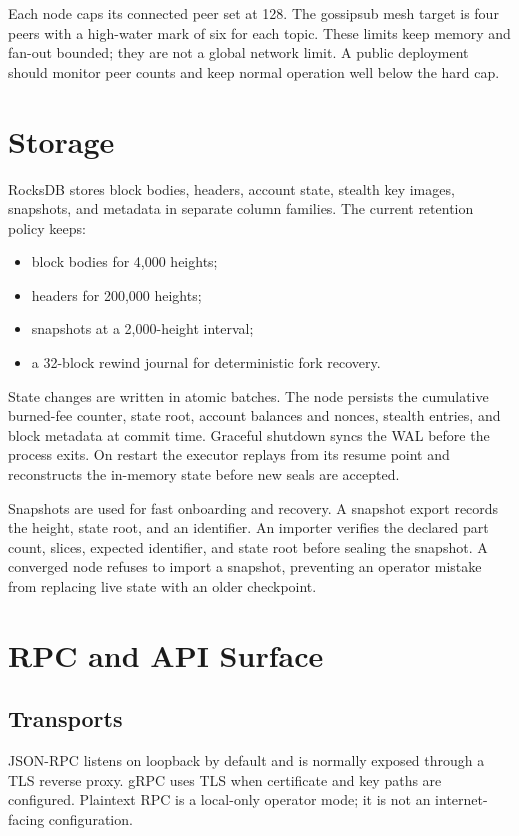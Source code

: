 \documentclass[11pt,a4paper]{article}
\begin{document}
Each node caps its connected peer set at 128. The gossipsub mesh target is four
peers with a high-water mark of six for each topic. These limits keep memory
and fan-out bounded; they are not a global network limit. A public deployment
should monitor peer counts and keep normal operation well below the hard cap.

\section{Storage}

RocksDB stores block bodies, headers, account state, stealth key images,
snapshots, and metadata in separate column families. The current retention
policy keeps:
\begin{itemize}[leftmargin=*]
  \item block bodies for 4,000 heights;
  \item headers for 200,000 heights;
  \item snapshots at a 2,000-height interval;
  \item a 32-block rewind journal for deterministic fork recovery.
\end{itemize}

State changes are written in atomic batches. The node persists the cumulative
burned-fee counter, state root, account balances and nonces, stealth entries,
and block metadata at commit time. Graceful shutdown syncs the WAL before the
process exits. On restart the executor replays from its resume point and
reconstructs the in-memory state before new seals are accepted.

Snapshots are used for fast onboarding and recovery. A snapshot export records
the height, state root, and an identifier. An importer verifies the declared
part count, slices, expected identifier, and state root before sealing the
snapshot. A converged node refuses to import a snapshot, preventing an
operator mistake from replacing live state with an older checkpoint.

\section{RPC and API Surface}

\subsection{Transports}

JSON-RPC listens on loopback by default and is normally exposed through a TLS
reverse proxy. gRPC uses TLS when certificate and key paths are configured.
Plaintext RPC is a local-only operator mode; it is not an internet-facing
configuration.
\end{document}
